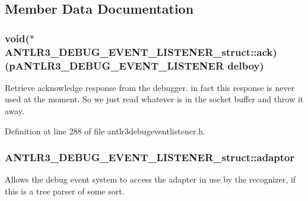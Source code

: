 \subsection{Member Data Documentation}
\hypertarget{struct_a_n_t_l_r3___d_e_b_u_g___e_v_e_n_t___l_i_s_t_e_n_e_r__struct_af73fc8d7ab547c2769c44fcced3d91f8}{
\subsubsection[{ack}]{\setlength{\rightskip}{0pt plus 5cm}void($\ast$ A\-N\-T\-L\-R3\-\_\-\-D\-E\-B\-U\-G\-\_\-\-E\-V\-E\-N\-T\-\_\-\-L\-I\-S\-T\-E\-N\-E\-R\-\_\-struct\-::ack)({\bf p\-A\-N\-T\-L\-R3\-\_\-\-D\-E\-B\-U\-G\-\_\-\-E\-V\-E\-N\-T\-\_\-\-L\-I\-S\-T\-E\-N\-E\-R} delboy)}}\label{struct_a_n_t_l_r3___d_e_b_u_g___e_v_e_n_t___l_i_s_t_e_n_e_r__struct_af73fc8d7ab547c2769c44fcced3d91f8}
Retrieve acknowledge response from the debugger. in fact this response is never used at the moment. So we just read whatever is in the socket buffer and throw it away. 

Definition at line 288 of file antlr3debugeventlistener.\-h.

\hypertarget{struct_a_n_t_l_r3___d_e_b_u_g___e_v_e_n_t___l_i_s_t_e_n_e_r__struct_ad4f7a3ec200a922978922fb86fb72023}{
\subsubsection[{adaptor}]{ A\-N\-T\-L\-R3\-\_\-\-D\-E\-B\-U\-G\-\_\-\-E\-V\-E\-N\-T\-\_\-\-L\-I\-S\-T\-E\-N\-E\-R\-\_\-struct\-::adaptor}}\label{struct_a_n_t_l_r3___d_e_b_u_g___e_v_e_n_t___l_i_s_t_e_n_e_r__struct_ad4f7a3ec200a922978922fb86fb72023}
Allows the debug event system to access the adapter in use by the recognizer, if this is a tree parser of some sort. 

